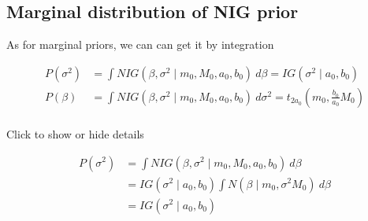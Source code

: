 \documentclass[
]{book}
\theoremstyle{definition}
\theoremstyle{definition}
\theoremstyle{definition}
\theoremstyle{definition}
\theoremstyle{remark}
\begin{document}
\hypertarget{marginal-distribution-of-nig-prior}{%
\subsection{Marginal distribution of NIG prior}\label{marginal-distribution-of-nig-prior}}

As for marginal priors, we can can get it by integration

\[
\begin{aligned}
P(\sigma^2) & = \int N I G\left(\beta, \sigma^{2} \mid m_{0}, M_{0}, a_{0}, b_{0}\right) \  d\beta=I G\left(\sigma^{2} \mid a_{0}, b_{0}\right) \\
P(\beta) & = \int N I G\left(\beta, \sigma^{2} \mid m_{0}, M_{0}, a_{0}, b_{0}\right) \  d\sigma^{2}=t_{2a_0}(m_0, \frac{b_0}{a_0}M_0) \\
\end{aligned}
\]

Click to show or hide details

\begin{align}
    P\left(\sigma^{2} \right) &= \int NIG\left(\beta, \sigma^{2} \mid m_{0}, M_{0}, a_{0}, b_{0}\right) \  d\beta \\
    &=IG\left(\sigma^{2} \mid a_{0}, b_{0}\right) \int N\left(\beta \mid m_{0}, \sigma^{2} M_{0}\right) \  d\beta \\
    &=IG\left(\sigma^{2} \mid a_{0}, b_{0}\right)
\end{align}
\end{document}
